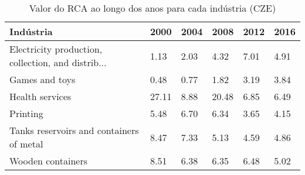 \begin{table}
\centering
\caption{Valor do RCA ao longo dos anos para cada indústria (CZE)}
\label{tab:ex3-tempo-CZE}
\begin{tabular}{p{6cm}p{1.5cm}p{1.5cm}p{1.5cm}p{1.5cm}p{1.5cm}}
\toprule
                                         Indústria &  2000 & 2004 &  2008 & 2012 & 2016 \\
\midrule
Electricity production, collection, and distrib... &  1.13 & 2.03 &  4.32 & 7.01 & 4.91 \\
                                    Games and toys &  0.48 & 0.77 &  1.82 & 3.19 & 3.84 \\
                                   Health services & 27.11 & 8.88 & 20.48 & 6.85 & 6.49 \\
                                          Printing &  5.48 & 6.70 &  6.34 & 3.65 & 4.15 \\
          Tanks reservoirs and containers of metal &  8.47 & 7.33 &  5.13 & 4.59 & 4.86 \\
                                 Wooden containers &  8.51 & 6.38 &  6.35 & 6.48 & 5.02 \\
\bottomrule
\end{tabular}
\end{table}
